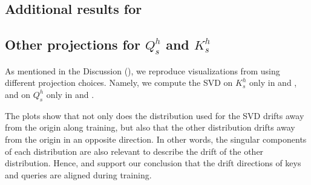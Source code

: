 
\begin{appendices}
\section{Additional results for }
\subsection{Other projections for $Q^h_s$ and $K^h_s$}
\label{sec:other_projs}
As mentioned in the Discussion (), we reproduce visualizations from  using different projection choices. Namely, we compute the SVD on $K^h_s$ only in  and , and on $Q^h_s$ only in  and .

The plots show that not only does the distribution used for the SVD drifts away from the origin along training, but also that the other distribution drifts away from the origin in an opposite direction. In other words, the singular components of each distribution are also relevant to describe the drift of the other distribution. Hence,  and  support our conclusion that the drift directions of keys and queries are aligned during training.



\end{appendices}
